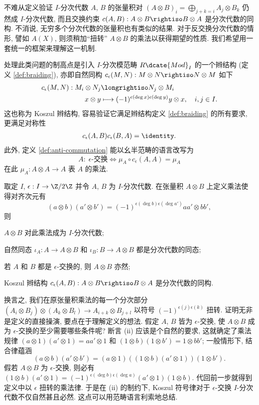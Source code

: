 不难从定义验证 $I$-分次代数 $A$, $B$ 的张量积对 $(A \otimes B)_i = \bigoplus_{j+k=i} A_j \otimes B_k$ 仍然成 $I$-分次代数, 而且交换约束 $c(A,B): A \otimes B \rightiso B \otimes A$ 是分次代数的同构. 不消说, 无穷多个分次代数的张量积也有类似的结果. 对于反交换分次代数的情形, 譬如 $A(X)$, 则须稍加``扭转'' $A \otimes B$ 的乘法以获得期望的性质. 我们希望用一套统一的框架来理解这一机制.

处理此类问题的制高点是引入 $I$-分次模范畴 $R\dcate{Mod}_I$ 的一个辫结构 (定义 \ref{def:braiding}), 亦即自然同构 $c_\epsilon(M, N): M \otimes N \rightiso N \otimes M$ 如下
\begin{align*}
	c_\epsilon(M,N): M_i \otimes N_j & \longrightiso N_j \otimes M_i \\
	x \otimes y & \longmapsto (-1)^{\epsilon(\deg x)\epsilon(\deg y)} y \otimes x, \quad i,j \in I.
\end{align*}
这也称为 Koszul 辫结构, 容易验证它满足辫结构定义 \ref{def:braiding} 的所有要求, 更满足对称性
\begin{gather}\label{eqn:Koszul-braiding-symm}
	c_\epsilon(A,B) c_\epsilon(B, A) = \identity.
\end{gather}
此外, 定义 \ref{def:anti-commutation} 能以幺半范畴的语言改写为
\[ A:\; \epsilon\text{-交换} \iff \mu_A \circ c_\epsilon(A,A) = \mu_A \]
在此 $\mu_A: A \otimes A \to A$ 表 $A$ 的乘法.

\begin{definition-theorem}\label{def:Koszul-sign-alg}
	取定 $I$, $\epsilon: I \to \Z/2\Z$ 并令 $A$, $B$ 为 $I$-分次代数. 在张量积 $A \otimes B$ 上定义乘法使得对齐次元有
	\[ (a \otimes b)(a' \otimes b') = (-1)^{\epsilon(\deg b)\epsilon(\deg a')} aa' \otimes bb' , \]
	则
	\begin{compactenum}[(i)]
		\item $A \otimes B$ 对此乘法成为 $I$-分次代数;
		\item 自然同态 $\iota_A: A \to A \otimes B$ 和 $\iota_B: B \to A \otimes B$ 都是分次代数的同态;
		\item 若 $A$ 和 $B$ 都是 $\epsilon$-交换的, 则 $A \otimes B$ 亦然;
		\item Koszul 辫结构 $c_\epsilon(A, B): A \otimes B \rightiso B \otimes A$ 是分次代数的同构.
	\end{compactenum}
\end{definition-theorem}
换言之, 我们在原张量积乘法的每一个分次部分 $(A_i \otimes B_j) \otimes (A_k \otimes B_l) \to A_{i+k} \otimes B_{j+l}$ 以符号 $(-1)^{\epsilon(j)\epsilon(k)}$ 扭转. 证明无非是定义的直接操演, 要点在于理解定义的想法. 假定 $A$, $B$ 皆为 $\epsilon$-交换, 使 $A \otimes B$ 成为 $\epsilon$-交换的至少需要哪些条件呢? 断言 (ii) 应该是个自然的要求, 这就确定了乘法规律 $(a \otimes 1)(a' \otimes 1) = aa' \otimes 1$ 和 $(1 \otimes b)(1 \otimes b') = 1 \otimes bb'$; 一般情形下, 结合律蕴涵
\[ (a \otimes b)(a' \otimes b') = (a \otimes 1) \left((1 \otimes b)(a' \otimes 1)\right) (1 \otimes b'). \]
假若 $A \otimes B$ 为 $\epsilon$-交换, 则必有 $(1 \otimes b)(a' \otimes 1) = (-1)^{\epsilon(\deg b)\epsilon(\deg a)} (a' \otimes 1)(1 \otimes b)$. 代回前一步就得到定义中以 $\epsilon$ 扭转的乘法律. 于是在 (ii) 的制约下, Koszul 符号律对于 $\epsilon$-交换 $I$-分次代数不仅自然甚且必然. 这点可以用范畴语言利索地总结.

